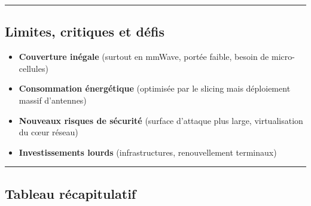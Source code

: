 \documentclass[
  french,
]{article}
\providecommand{\tightlist}{%
  \setlength{\itemsep}{0pt}\setlength{\parskip}{0pt}}
\begin{document}
\begin{center}\rule{0.5\linewidth}{0.5pt}\end{center}

\subsection{Limites, critiques et
défis}\label{limites-critiques-et-duxe9fis}

\begin{itemize}
\tightlist
\item
  \textbf{Couverture inégale} (surtout en mmWave, portée faible, besoin
  de micro-cellules)
\item
  \textbf{Consommation énergétique} (optimisée par le slicing mais
  déploiement massif d'antennes)
\item
  \textbf{Nouveaux risques de sécurité} (surface d'attaque plus large,
  virtualisation du cœur réseau)
\item
  \textbf{Investissements lourds} (infrastructures, renouvellement
  terminaux)
\end{itemize}

\begin{center}\rule{0.5\linewidth}{0.5pt}\end{center}

\subsection{Tableau récapitulatif}\label{tableau-ruxe9capitulatif}
\end{document}
